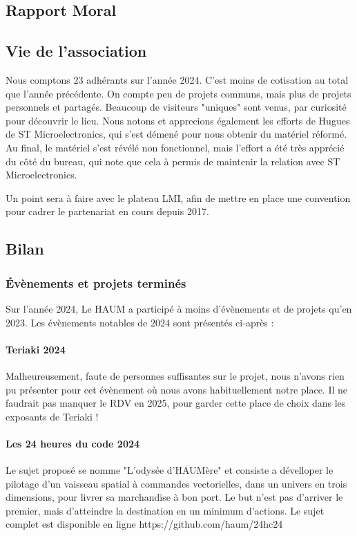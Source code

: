 \documentclass[a4paper, 11pt]{article}
\begin{document}
\clearpage
\begin{appendices}
\section{Rapport Moral}

\subsection{Vie de l'association}

Nous comptons 23 adhérants sur l'année 2024. C'est moins de cotisation au total
que l'année précédente.
On compte peu de projets communs, mais plus de projets personnels et partagés.
Beaucoup de visiteurs "uniques" sont venus, par curiosité pour découvrir le lieu.
Nous notons et apprecions également les efforts de Hugues de ST Microelectronics, qui
s'est démené pour nous obtenir du matériel réformé. Au final, le matériel s'est révélé
non fonctionnel, mais l'effort a été très apprécié du côté du bureau, qui note que cela
à permis de maintenir la relation avec ST Microelectronics.

Un point sera à faire avec le plateau LMI, afin de mettre en place une convention
pour cadrer le partenariat en cours depuis 2017.

\subsection{Bilan}

\subsubsection{Évènements et projets terminés}

Sur l'année 2024, Le HAUM a participé à moins d'évènements et de projets qu'en 2023.
Les évènements notables de 2024 sont présentés ci-après :

\paragraph{Teriaki 2024} Malheureusement, faute de personnes suffisantes sur le projet,
nous n'avons rien pu présenter pour cet évènement où nous avons habituellement notre
place. Il ne faudrait pas manquer le RDV en 2025, pour garder cette place de choix dans
les exposants de Teriaki !

\paragraph{Les 24 heures du code 2024} Le sujet proposé se nomme "L'odysée d'HAUMère" et
consiste a dévelloper le pilotage d'un vaisseau spatial à commandes vectorielles, dans un
univers en trois dimensions, pour livrer sa marchandise à bon port. Le but n'est pas
d'arriver le premier, mais d'atteindre la destination en un minimum d'actions. Le sujet
complet est disponible en ligne https://github.com/haum/24hc24


\end{appendices}
\end{document}
